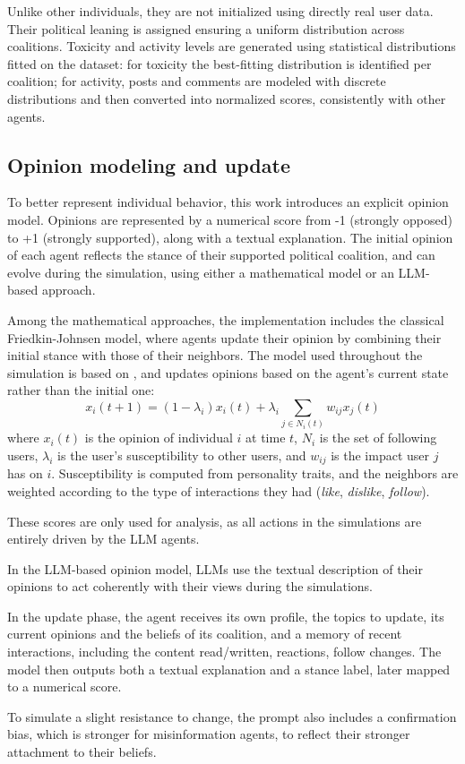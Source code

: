 Unlike other individuals, they are not initialized using directly real user data.
Their political leaning is assigned ensuring a uniform distribution across coalitions.
Toxicity and activity levels are generated using statistical distributions fitted on the dataset: for toxicity the best-fitting distribution is identified per coalition; for activity, posts and comments are modeled with discrete distributions and then converted into normalized scores, consistently with other agents.


\subsection{Opinion modeling and update}
To better represent individual behavior, this work introduces an explicit opinion model.
Opinions are represented by a numerical score from -1 (strongly opposed) to +1 (strongly supported), along with a textual explanation. 
The initial opinion of each agent reflects the stance of their supported political coalition, and can evolve during the simulation, using either a mathematical model or an LLM-based approach.

\medskip
Among the mathematical approaches, the implementation includes the classical Friedkin-Johnsen model, where agents update their opinion by combining their initial stance with those of their neighbors.
The model used throughout the simulation is based on \cite{Ye2018Opinion}, and updates opinions based on the agent's current state rather than the initial one:
\[
x_i(t + 1) = (1 - \lambda_i) x_i(t) + \lambda_i  \sum_{j \in N_i(t)} w_{ij} x_j (t)
\]
where $x_i(t)$ is the opinion of individual $i$ at time $t$, $N_i$ is the set of following users, $\lambda_i$ is the user's susceptibility to other users, and $w_{ij}$ is the impact user $j$ has on $i$. 
Susceptibility is computed from personality traits, and the neighbors are weighted according to the type of interactions they had (\textit{like}, \textit{dislike}, \textit{follow}). 

These scores are only used for analysis, as all actions in the simulations are entirely driven by the LLM agents.


\medskip
In the LLM-based opinion model, LLMs use the textual description of their opinions to act coherently with their views during the simulations.

In the update phase, the agent receives its own profile, the topics to update, its current opinions and the beliefs of its coalition, and a memory of recent interactions, including the content read/written, reactions, follow changes.
The model then outputs both a textual explanation and a stance label, later mapped to a numerical score.

To simulate a slight resistance to change, the prompt also includes a confirmation bias, which is stronger for misinformation agents, to reflect their stronger attachment to their beliefs.


